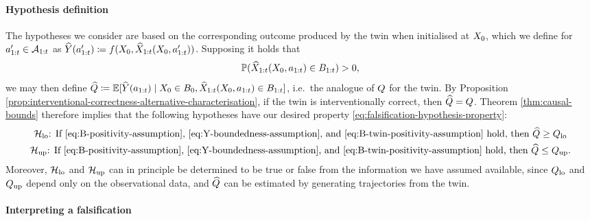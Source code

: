 %
%

%
%

%


%
%


\paragraph{Hypothesis definition}

The hypotheses we consider are based on the corresponding outcome produced by the twin when initialised at $X_0$, which we define for $a_{1:t}' \in \mathcal{A}_{1:t}$ as $\widehat{Y}(a_{1:t}') \coloneqq f(X_0, \widehat{X}_{1:t}(X_0, a_{1:t}'))$.
Supposing it holds that
\begin{equation} \label{eq:B-twin-positivity-assumption}
    \mathbb{P}(\widehat{X}_{1:t}(X_0, a_{1:t}) \in B_{1:t}) > 0,
\end{equation}
we may then define
%
$\widehat{Q} \coloneqq \mathbb{E}[\widehat{Y}(a_{1:t}) \mid X_0 \in B_0, \widehat{X}_{1:t}(X_0, a_{1:t}) \in B_{1:t}]$, i.e.\
the analogue of $Q$ for the twin.
By Proposition \ref{prop:interventional-correctness-alternative-characterisation}, if the twin is interventionally correct, then $\widehat{Q} = Q$.
Theorem \ref{thm:causal-bounds} therefore implies that the following hypotheses have our desired property \eqref{eq:falsification-hypothesis-property}:
%
\begin{gather*}
\text{$\mathcal{H}_{\mathrm{lo}}$: If \eqref{eq:B-positivity-assumption}, \eqref{eq:Y-boundedness-assumption}, and \eqref{eq:B-twin-positivity-assumption} hold, then $\widehat{Q} \geq Q_{\mathrm{lo}}$} \\
\text{$\mathcal{H}_{\mathrm{up}}$: If \eqref{eq:B-positivity-assumption}, \eqref{eq:Y-boundedness-assumption}, and \eqref{eq:B-twin-positivity-assumption} hold, then $\widehat{Q} \leq Q_{\mathrm{up}}$.}
\end{gather*}
Moreover, $\mathcal{H}_{\mathrm{lo}}$ and $\mathcal{H}_{\mathrm{up}}$ can in principle be determined to be true or false from the information we have assumed available, since $Q_{\mathrm{lo}}$ and $Q_{\mathrm{up}}$ depend only on the observational data, and $\widehat{Q}$ can be estimated by generating trajectories from the twin.

%

%

%

%
%
%
%
%
%


%
%
%
%
%

%

%

%
%
%
%
%
%
%
%

\paragraph{Interpreting a falsification}

